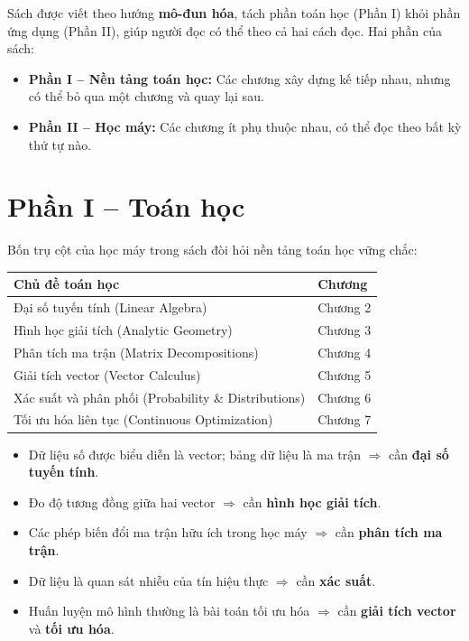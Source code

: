 \documentclass[12pt,a4paper]{article}
\begin{document}
Sách được viết theo hướng \textbf{mô-đun hóa}, tách phần toán học (Phần I) khỏi phần ứng dụng (Phần II), giúp người đọc có thể theo cả hai cách đọc. Hai phần của sách:

\begin{itemize}
  \item \textbf{Phần I -- Nền tảng toán học:} Các chương xây dựng kế tiếp nhau, nhưng có thể bỏ qua một chương và quay lại sau.
  \item \textbf{Phần II -- Học máy:} Các chương ít phụ thuộc nhau, có thể đọc theo bất kỳ thứ tự nào.
\end{itemize}

\section{Phần I -- Toán học}

Bốn trụ cột của học máy trong sách đòi hỏi nền tảng toán học vững chắc:

\begin{center}
\begin{tabular}{|l|l|}
\hline
\textbf{Chủ đề toán học} & \textbf{Chương} \\
\hline
Đại số tuyến tính (Linear Algebra) & Chương 2 \\
Hình học giải tích (Analytic Geometry) & Chương 3 \\
Phân tích ma trận (Matrix Decompositions) & Chương 4 \\
Giải tích vector (Vector Calculus) & Chương 5 \\
Xác suất và phân phối (Probability \& Distributions) & Chương 6 \\
Tối ưu hóa liên tục (Continuous Optimization) & Chương 7 \\
\hline
\end{tabular}
\end{center}

\begin{dinhlybox}
\begin{itemize}
  \item Dữ liệu số được biểu diễn là vector; bảng dữ liệu là ma trận $\Rightarrow$ cần \textbf{đại số tuyến tính}.
  \item Đo độ tương đồng giữa hai vector $\Rightarrow$ cần \textbf{hình học giải tích}.
  \item Các phép biến đổi ma trận hữu ích trong học máy $\Rightarrow$ cần \textbf{phân tích ma trận}.
  \item Dữ liệu là quan sát nhiễu của tín hiệu thực $\Rightarrow$ cần \textbf{xác suất}.
  \item Huấn luyện mô hình thường là bài toán tối ưu hóa $\Rightarrow$ cần \textbf{giải tích vector} và \textbf{tối ưu hóa}.
\end{itemize}
\end{dinhlybox}
\end{document}

